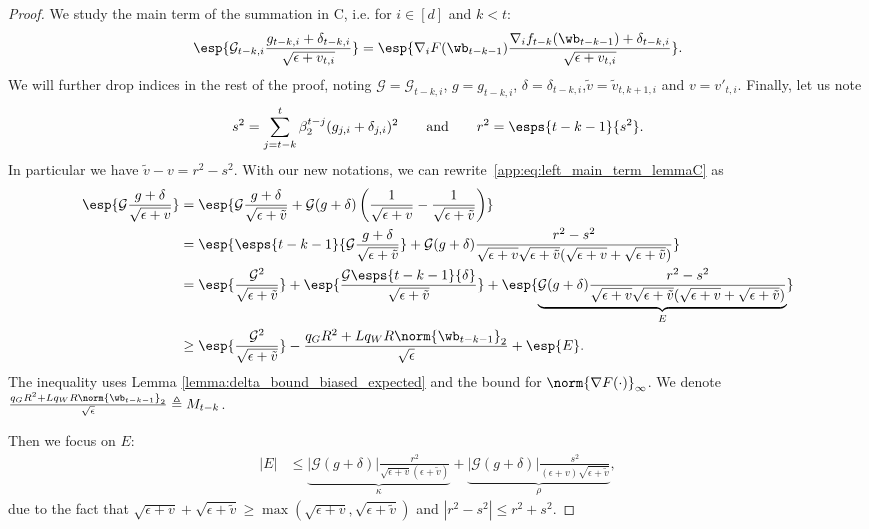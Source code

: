 \documentclass[11pt, letterpaper]{article}
\begin{document}
\begin{proof}
We study the main term of the summation in C, i.e. for $i \in [d]$ and $k < t$:
\begin{align}
\esp{\mathcal{G}_{t -k, i} \frac{g_{t-k,i}+\delta_{t-k,i}}{\sqrt{\epsilon+v_{t, i}}}} = \esp{\nabla_i F(\wb_{t - k -1})\frac{\nabla_i f_{t -k}(\wb_{t - k - 1})+\delta_{t-k,i}}{\sqrt{\epsilon+v_{t, i}}}}.
\label{app:eq:left_main_term_lemmaC}
\end{align}
We will further drop indices in the rest of the proof, noting $\mathcal{G} = \mathcal{G}_{t - k, i}$,
$g = g_{t -k ,i }$, $\delta=\delta_{t-k,i}$,$\tilde{v} = \tilde{v}_{t, k + 1, i}$ and $v = v'_{t, i}$. Finally, let us note
\begin{equation}
    s^2 = \sum_{j=t- k}^{t}\beta_2^{t-j}(g_{j,i}+\delta_{j,i})^2 \qquad \text{and}\qquad
    r^2 = \esps{t - k - 1}{s^2}.
    \label{app:eq:holder_ref2_lemmaC}
\end{equation}
In particular we have $\tilde{v} - v = r^2 - s^2$. With our new notations, we can rewrite~\eqref{app:eq:left_main_term_lemmaC} as
\begin{align}
\nonumber
    \esp{\mathcal{G} \frac{g+\delta}{\sqrt{\epsilon+v}}} &= \esp{\mathcal{G} \frac{g+\delta}{\sqrt{\epsilon+\tilde{v}}} + \mathcal{G}(g+\delta) \left(\frac{1}{\sqrt{\epsilon+v}} - \frac1{\sqrt{\epsilon+\tilde{v}}}\right)} \\
    \nonumber
    &= \esp{\esps{t -k - 1}{\mathcal{G} \frac{g+\delta}{\sqrt{\epsilon+\tilde{v}}}} + \mathcal{G} (g+\delta) \frac{r^2 - s^2}{\sqrt{\epsilon+v}\sqrt{\epsilon+\tilde{v}}(\sqrt{\epsilon+v} + \sqrt{\epsilon+\tilde{v}})}}\\
    \nonumber
    &= \esp{\frac{\mathcal{G}^2}{\sqrt{\epsilon+\tilde{v}}}} +\esp{\frac{\mathcal{G}\esps{t-k-1}{\delta}}{\sqrt{\epsilon+\tilde{v}}}}+\esp{\underbrace{\mathcal{G} (g+\delta) \frac{r^2 - s^2}{\sqrt{\epsilon+v}\sqrt{\epsilon+\tilde{v}}(\sqrt{\epsilon+v} + \sqrt{\epsilon+\tilde{v}})}}_{E}}\\
    &\geq \esp{\frac{\mathcal{G}^2}{\sqrt{\epsilon+\tilde{v}}}}-\frac{q_GR^2+Lq_WR\norm{\wb_{t-k-1}}_2}{\sqrt{\epsilon}} +\esp{E}.
    \label{app:eq:cool_plus_bad_lemmaC}
\end{align}
The inequality uses Lemma \ref{lemma:delta_bound_biased_expected} and the bound for $\norm{\nabla F(\cdot)}_\infty$. We denote $\frac{q_GR^2+Lq_WR\norm{\wb_{t-k-1}}_2}{\sqrt{\epsilon}} \triangleq M_{t-k}$.

Then we focus on $E$:
\begin{align*}
    |E| &\leq \underbrace{|\mathcal{G} (g+\delta)|\frac{r^2}{\sqrt{\epsilon+v} (\epsilon + \tilde{v})}}_\kappa +
    \underbrace{|\mathcal{G} (g+\delta)|\frac{s^2}{(\epsilon + v)\sqrt{\epsilon+\tilde{v}}}}_\rho,
\end{align*}
due to the fact that $\sqrt{\epsilon+v} + \sqrt{\epsilon+\tilde{v}} \geq \max(\sqrt{\epsilon+v},
\sqrt{\epsilon+\tilde{v}})$ and
$|r^2 - s^2| \leq r^2 + s^2$.



\end{proof}
\end{document}

